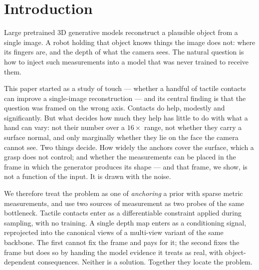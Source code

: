 \documentclass[conference]{IEEEtran}
\begin{document}
\section{Introduction}

Large pretrained 3D generative models reconstruct a plausible object from a single
image. A robot holding that object knows things the image does not: where its fingers
are, and the depth of what the camera sees. The natural question is how to inject
such measurements into a model that was never trained to receive them.

This paper started as a study of touch --- whether a handful of tactile contacts can
improve a single-image reconstruction --- and its central finding is that the question
was framed on the wrong axis. Contacts do help, modestly and significantly. But what
decides how much they help has little to do with what a hand can vary: not their number
over a $16\times$ range, not whether they carry a surface normal, and only marginally
whether they lie on the face the camera cannot see. Two things decide. How widely the
anchors cover the surface, which a grasp does not control; and whether the measurements
can be placed in the frame in which the generator produces its shape --- and that frame,
we show, is not a function of the input. It is drawn with the noise.

We therefore treat the problem as one of \emph{anchoring} a prior with sparse metric
measurements, and use two sources of measurement as two probes of the same bottleneck.
Tactile contacts enter as a differentiable constraint applied during sampling, with no
training. A single depth map enters as a conditioning signal, reprojected into the
canonical views of a multi-view variant of the same backbone. The first cannot fix the
frame and pays for it; the second fixes the frame but does so by handing the model
evidence it treats as real, with object-dependent consequences. Neither is a solution.
Together they locate the problem.
\end{document}
